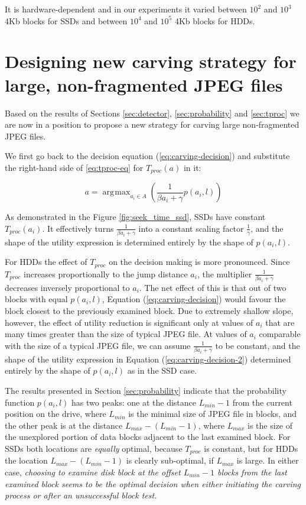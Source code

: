 \documentclass[final,5p,times,twocolumn,authoryear]{elsarticle}
\DeclareMathOperator*{\argmax}{\arg\!\max}
\begin{document}
It is hardware-dependent and in our experiments it varied between $10^2$ and $10^3$ 4Kb blocks for SSDs and between $10^4$ and $10^5$ 4Kb blocks for HDDs.

\section{Designing new carving strategy for large, non-fragmented JPEG files}
\label{sec:decision}

Based on the results of Sections \ref{sec:detector}, \ref{sec:probability} and \ref{sec:tproc} we are now in a position to propose a new strategy for carving large non-fragmented JPEG files.

We first go back to the decision equation (\ref{eq:carving-decision}) and substitute the right-hand side of \ref{eq:tproc-eq} for $T_{proc}(a)$ in it: 

\begin{equation} \label{eq:carving-decision-2}
a = \argmax_{a_i \in A} \left( \frac{1}{\beta a_i + \gamma} p(a_i,l)\right)
\end{equation}

As demonstrated in the Figure \ref{fig:seek_time_ssd}, SSDs have constant $T_{proc}(a_i)$. It effectively turns $\frac{1}{\beta a_i + \gamma}$ into a constant scaling factor $\frac{1}{\gamma}$, and the shape of the utility expression is determined entirely by the shape of $p(a_i,l)$.

For HDDs the effect of $T_{proc}$ on the decision making is more pronounced. Since $T_{proc}$ increases proportionally to the jump distance $a_i$, the multiplier $\frac{1}{\beta a_i + \gamma}$ decreases inversely proportional to $a_i$. The net effect of this is that out of two blocks with equal $p(a_i,l)$,  Equation (\ref{eq:carving-decision}) would favour the block closest to the previously examined block. Due to extremely shallow slope, however, the effect of utility reduction is significant only at values of $a_i$ that are many times greater than the size of typical JPEG file. At values of $a_i$ comparable with the size of a typical JPEG file, we can assume $\frac{1}{\beta a_i + \gamma}$ to be constant, and the shape of the utility expression in Equation (\ref{eq:carving-decision-2}) determined entirely by the shape of $p(a_i,l)$ as in the SSD case.

The results presented in Section \ref{sec:probability}
indicate that the probability function $p(a_i,l)$ has two peaks: one at the distance $L_{min}-1$ from the current position on the drive, where $L_{min}$ is the minimal size of JPEG file in blocks, and the other peak is at the distance $L_{max}-(L_{min}-1)$, where $L_{max}$ is the size of the unexplored portion of data blocks adjacent to the last examined block. For SSDs both locations are \emph{equally} optimal, because $T_{proc}$ is constant, but for HDDs the location $L_{max}-(L_{min}-1)$ is clearly sub-optimal, if $L_{max}$ is large. In either case, \emph{choosing to examine disk block at the offset $L_{min}-1$ blocks from the last examined block seems to be the optimal decision when either initiating the carving process or after an unsuccessful block test.}
\end{document}
